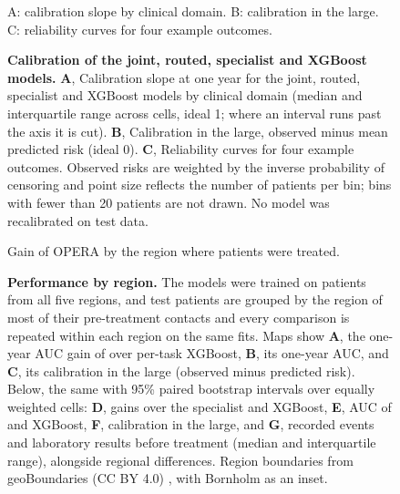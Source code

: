 \begin{figure}[p]
    {A: calibration slope by clinical domain. B: calibration in the large.
    C: reliability curves for four example outcomes.}
  \caption{\textbf{Calibration of the joint, routed, specialist and XGBoost
  models.} \textbf{A},
  Calibration slope at one year for the joint, routed, specialist and
  XGBoost models by clinical domain (median and interquartile range across cells, ideal 1; where an interval
  runs past the axis it is cut). \textbf{B}, Calibration in the large, observed minus
  mean predicted risk (ideal 0). \textbf{C}, Reliability curves for four example outcomes. Observed risks are weighted by the inverse probability of censoring and point size reflects the number of patients per bin; bins with fewer than 20
  patients are not drawn. No model
  was recalibrated on test data.}
  \label{fig:calibration}
\end{figure}

\begin{figure}[p]
    {Gain of OPERA by the region where patients were treated.}
  \caption{\textbf{Performance by region.} The models were trained on patients from all five regions, and test patients are grouped by the
  region of most of their pre-treatment contacts and every comparison is
  repeated within each region on the same fits. Maps show \textbf{A}, the one-year AUC gain of \opera{} over per-task XGBoost, \textbf{B}, its one-year AUC, and \textbf{C}, its calibration in the large (observed minus predicted risk). Below, the same with 95\% paired bootstrap intervals over
  equally weighted cells: \textbf{D}, gains over the specialist and XGBoost, \textbf{E}, AUC of \opera{} and XGBoost, \textbf{F}, calibration in the large, and \textbf{G}, recorded events and laboratory results before
  treatment (median and interquartile range), alongside regional
  differences. Region boundaries from geoBoundaries (CC BY 4.0)
  \citep{runfola2020geoboundaries}, with Bornholm as an inset.}
  \label{fig:supp-regions}
\end{figure}

